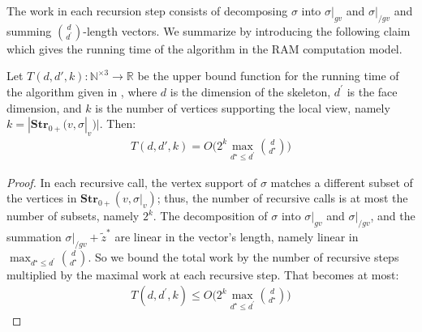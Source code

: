 The work in each recursion step consists of decomposing $\sigma$ into $\sigma|_{gv}$ and $\sigma|_{/gv}$ and summing ${ d \choose d^{\prime} }$-length vectors. We summarize by introducing the following claim which gives the running time of the algorithm in the RAM computation model.
\begin{claim}
  Let $ T(d, d', k) : \mathbb{N}^{\times 3} \rightarrow \mathbb{R} $ be the upper bound function for the running time of the algorithm given in , where $d$ is the dimension of the skeleton, $d^{\prime}$ is the face dimension, and $k$ is the number of vertices supporting the local view, namely $k = |\mathbf{Str}_{0+}(v, \sigma|_{v} )|$. Then:
  \begin{equation*}
    \begin{split}
      T(d, d', k) = O\bigl( 2^{k} \max_{d^{\star}\le d^{\prime}}{ d \choose d^{\star} } \bigr)
    \end{split}
  \end{equation*}
\end{claim}
\begin{proof}
  In each recursive call, the vertex support of $\sigma$ matches a different subset of the vertices in $\mathbf{Str}_{0+}(v, \sigma|_{v})$; thus, the number of recursive calls is at most the number of subsets, namely $2^{k}$. The decomposition of $\sigma$ into $\sigma|_{gv}$ and $\sigma|_{/gv}$, and the summation $\sigma|_{/gv} + \tilde{z}^{*}$ are linear in the vector's length, namely linear in $\max_{d^{\star} \le d^{\prime} } {d \choose d^{\star}}$. So we bound the total work by the number of recursive steps multiplied by the maximal work at each recursive step. That becomes at most:
\begin{equation*}
  \begin{split}
    T(d,d^{\prime},k) \le O\bigl( 2^{k} \max_{d^{\star} \le d^{\prime}} { d \choose d^{\star} } \bigr) 
  \end{split}
\end{equation*}
\end{proof}





